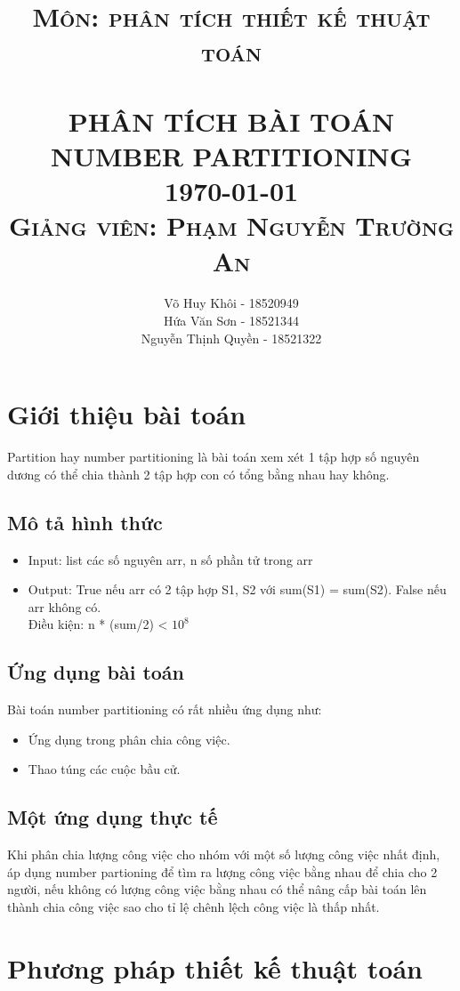 \documentclass[12pt, letterpaper]{article}
\title{	\normalsize \textsc{Môn: phân tích thiết kế thuật toán} 	%
		 	\\[2.0cm]								%
			\HRule{0.5pt} \\						%
			\LARGE \textbf{\uppercase{Phân tích bài toán number partitioning}}	%
			\HRule{2pt} \\ [0.5cm]		%
			\normalsize \today	%
			\\[1.0cm]
			\normalsize \textsc{Giảng viên: Phạm Nguyễn Trường An\\}
		}
\author{
		Võ Huy Khôi - 18520949\\
		Hứa Văn Sơn - 18521344\\
		Nguyễn Thịnh Quyền - 18521322\\
}
\makeatletter
\def\printtitle{%
    {\centering \@title\par}}
\def\printauthor{%
    {\centering \large \@author}}
\makeatother
\begin{document}
\thispagestyle{empty}		%

\printtitle					%
  	\vfill
\printauthor				%
\newpage
\setcounter{page}{1}	
\tableofcontents
\newpage
\section{Giới thiệu bài toán}
    Partition hay number partitioning là bài toán xem xét 1 tập hợp số nguyên dương có thể chia thành 2 tập hợp con có tổng bằng nhau hay không.
\subsection{Mô tả hình thức}
\begin{itemize}
    \item Input: list các số nguyên arr, n số phần tử trong arr
    \item Output: True nếu arr có 2 tập hợp S1, S2 với sum(S1) = sum(S2).
    False nếu arr không có.\\
    Điều kiện: n * (sum/2) < \(10^8\)
\end{itemize}
\subsection{Ứng dụng bài toán}
    Bài toán number partitioning có rất nhiều ứng dụng như:
\begin{itemize}
    \item Ứng dụng trong phân chia công việc.
    \item Thao túng các cuộc bầu cử.
\end{itemize}
\subsection{Một ứng dụng thực tế}
Khi phân chia lượng công việc cho nhóm với một số lượng công việc nhất định, áp dụng number partioning để tìm ra lượng công việc bằng nhau để chia cho 2 người, nếu không có lượng công việc bằng nhau có thể nâng cấp bài toán lên thành chia công việc sao cho tỉ lệ chênh lệch công việc là thấp nhất. 
\section{Phương pháp thiết kế thuật toán}
\end{document}
